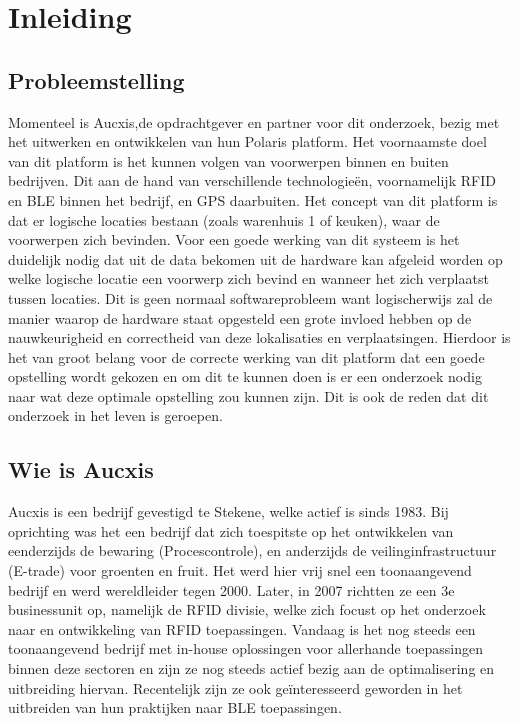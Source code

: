 
\chapter{Inleiding}
\label{ch:inleiding}

\section{Probleemstelling}
\label{sec:probleemstelling}

Momenteel is Aucxis,de opdrachtgever en partner voor dit onderzoek, bezig met het uitwerken en ontwikkelen van hun Polaris platform. Het voornaamste doel van dit platform is het kunnen volgen van voorwerpen binnen en buiten bedrijven. Dit aan de hand van verschillende technologieën, voornamelijk RFID en BLE binnen het bedrijf, en GPS daarbuiten. 
Het concept van dit platform is dat er logische locaties bestaan (zoals warenhuis 1 of keuken), waar de voorwerpen zich bevinden. Voor een goede werking van dit systeem is het duidelijk nodig dat uit de data bekomen uit de hardware kan afgeleid worden op welke logische locatie een voorwerp zich bevind en wanneer het zich verplaatst tussen locaties. Dit is geen normaal softwareprobleem want logischerwijs zal de manier waarop de hardware staat opgesteld een grote invloed hebben op de nauwkeurigheid en correctheid van deze lokalisaties en verplaatsingen. Hierdoor is het van groot belang voor de correcte werking van dit platform dat een goede opstelling wordt gekozen en om dit te kunnen doen is er een onderzoek nodig naar wat deze optimale opstelling zou kunnen zijn. Dit is ook de reden dat dit onderzoek in het leven is geroepen.

\section{Wie is Aucxis}
\label{sec:wie-is-aucxis}
Aucxis is een bedrijf gevestigd te Stekene, welke actief is sinds 1983. Bij oprichting was het een bedrijf dat zich toespitste op het ontwikkelen van eenderzijds de bewaring (Procescontrole), en anderzijds de veilinginfrastructuur (E-trade) voor groenten en fruit. Het werd hier vrij snel een toonaangevend bedrijf en werd wereldleider tegen 2000. Later, in 2007 richtten ze een 3e businessunit op, namelijk de RFID divisie, welke zich focust op het onderzoek naar en ontwikkeling van RFID toepassingen. Vandaag is het nog steeds een toonaangevend bedrijf met in-house oplossingen voor allerhande toepassingen binnen deze sectoren en zijn ze nog steeds actief bezig aan de optimalisering en uitbreiding hiervan. Recentelijk zijn ze ook geïnteresseerd geworden in het uitbreiden van hun praktijken naar BLE toepassingen.\autocite{Aucxis2020}


